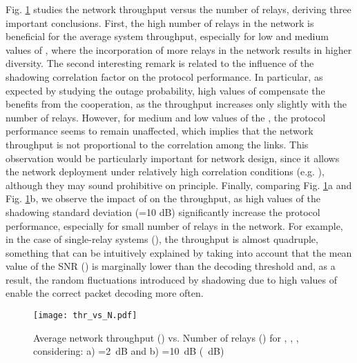 \documentclass[12pt,draftcls, onecolumn]{IEEEtran}
\begin{document}
Fig. \ref{th1} studies the network throughput versus the number of relays, deriving three important conclusions. First, the high number of relays in the network is beneficial for the average system throughput, especially for low and medium values of , where the incorporation of more relays in the network results in higher diversity. The second interesting remark is related to the influence of the shadowing correlation factor on the protocol performance. In particular, as expected by studying the outage probability, high values of  compensate the benefits from the cooperation, as the throughput increases only slightly with the number of relays. However, for medium and low values of the , the protocol performance seems to remain unaffected, which implies that the network throughput is not proportional to the correlation among the links. This observation would be particularly important for network design, since it allows the network deployment under relatively high correlation conditions (e.g. ), although they may sound prohibitive on principle. Finally, comparing Fig. \ref{th1}a and Fig. \ref{th1}b, we observe the impact of  on the throughput, as high values of the shadowing standard deviation (=10 dB) significantly increase the protocol performance, especially for small number of relays in the network. For example, in the case of single-relay systems (), the throughput is almost quadruple, something that can be intuitively explained by taking into account that the mean value of the SNR () is marginally lower than the decoding threshold and, as a result, the random fluctuations introduced by shadowing due to high values of  enable the correct packet decoding more often.

\begin{figure}[htb]
\centering
\texttt{[image: thr\_vs\_N.pdf]}
\caption{Average network throughput () vs. Number of relays () for , , , considering: a) =2~dB and b) =10~dB (~dB)} \label{th1}
\end{figure}
\end{document}
